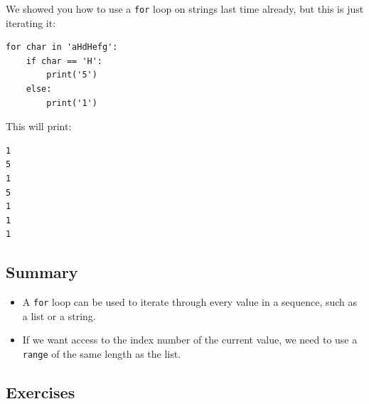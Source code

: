 \documentclass[11pt]{cselabheader}
\begin{document}
We showed you how to use a \lstinline!for! loop on strings last time already,
but this is just iterating it:
\begin{lstlisting}
for char in 'aHdHefg':
    if char == 'H':
        print('5')
    else:
        print('1')
\end{lstlisting}

This will print:
\begin{lstlisting}[style=bash]
1
5
1
5
1
1
1
\end{lstlisting}

\subsection{Summary}
\begin{itemize}
  \item A \lstinline{for} loop can be used to iterate through every value in a
    sequence, such as a list or a string.
  \item If we want access to the index number of the current value, we need to
    use a \lstinline{range} of the same length as the list.
\end{itemize}

\subsection{Exercises}
\label{subsec:forex}
\end{document}
